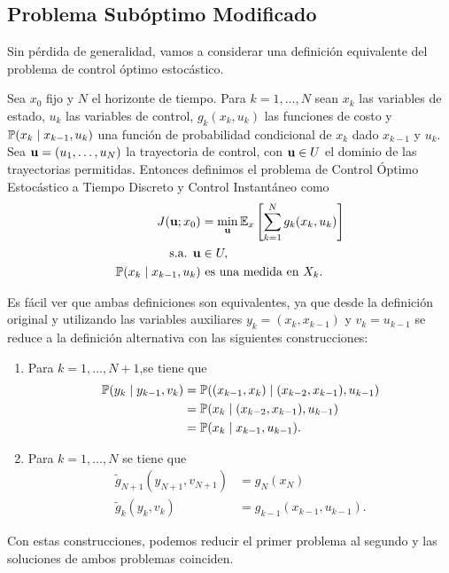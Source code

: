 \subsection{Problema Subóptimo Modificado}

Sin pérdida de generalidad, vamos a considerar una definición equivalente del problema de control óptimo estocástico.

\begin{definition}
	Sea \(x_{0}\) fijo y \(N\) el horizonte de tiempo. Para \(k = 1, \dotsc, N\) sean \(x_{k}\) las variables de estado, \(u_{k}\) las variables de control, \(g_{k}(x_{k}, u_{k})\) las funciones de costo y \(\mathbb{P}(x_{k} \mid x_{k-1}, u_{k})\) una función de probabilidad condicional de \(x_{k}\) dado \(x_{k-1}\) y \(u_{k}.\) Sea \(\mathbf{u} = (u_{1}, \dotsc, u_{N})\) la trayectoria de control, con \(\mathbf{u} \in U\) el dominio de las trayectorias permitidas. Entonces definimos el problema de Control Óptimo Estocástico a Tiempo Discreto y Control Instantáneo como
	\begin{align*}
		J(\mathbf{u}; x_{0})					&= \min_{\mathbf{u}} \mathbb{E}_{x} \left[\sum_{k=1}^{N} g_{k}(x_{k}, u_{k})\right] \\
		\text{s.a. } \mathbf{u}				&\in U,\\
		\mathbb{P}(x_{k} \mid x_{k-1}, u_{k})	&\text{ es una medida en } X_{k}.
	\end{align*}
\end{definition}

Es fácil ver que ambas definiciones son equivalentes, ya que desde la definición original y utilizando las variables auxiliares \(y_{k} = (x_{k}, x_{k-1})\) y \(v_{k} = u_{k-1}\) se reduce a la definición alternativa con las siguientes construcciones:
\begin{enumerate}
	\item Para \(k = 1, \dotsc, N+1\),se tiene que
	\begin{align*}
		\mathbb{P}(y_{k} \mid y_{k-1}, v_{k})	&= \mathbb{P}((x_{k-1}, x_{k}) \mid (x_{k-2}, x_{k-1}), u_{k-1})\\
											&= \mathbb{P}(x_{k} \mid (x_{k-2}, x_{k-1}), u_{k-1})\\
											&= \mathbb{P}(x_{k} \mid x_{k-1},u_{k-1}).
	\end{align*}
	\item Para \(k = 1, \dotsc, N\) se tiene que
	\begin{align*}
		\tilde{g}_{N+1}(y_{N+1}, v_{N+1})	&= g_{N}(x_{N})\\
		\tilde{g}_{k}(y_{k}, v_{k})			&= g_{k-1}(x_{k-1}, u_{k-1}).
	\end{align*}
\end{enumerate}
Con estas construcciones, podemos reducir el primer problema al segundo y las soluciones de ambos problemas coinciden.


